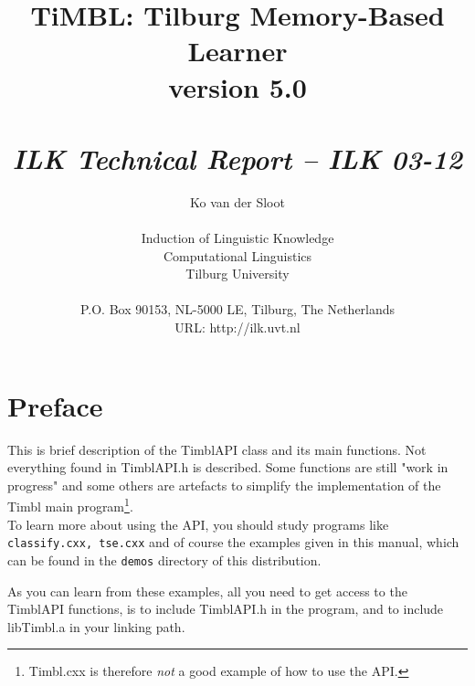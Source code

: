 

\parindent 0pt
\parskip 9pt

\newcommand{\chisq}{{$ \chi^2 $}}

\author{Ko van der Sloot\\ \ \\ Induction of Linguistic Knowledge\\
        Computational Linguistics\\ Tilburg University \\ \ \\
        P.O. Box 90153, NL-5000 LE, Tilburg, The Netherlands \\ URL:
        http://ilk.uvt.nl}

\title{{\huge TiMBL: Tilburg Memory-Based Learner} \\ \vspace*{0.5cm}
{\bf version 5.0} \\ \vspace*{0.5cm}{\huge API Reference Guide}\\
\vspace*{1cm} {\it ILK Technical Report -- ILK 03-12}}




\maketitle

\clearpage
\section{Preface}

This is brief description of the TimblAPI class and its main functions.
Not everything found in TimblAPI.h is described. Some functions are
still "work in progress" and some others are artefacts to simplify the
implementation of the Timbl main program\footnote{Timbl.cxx is
therefore {\em not} a good example of how to use the API.}. \\
To learn more about using the API, you should study programs like 
{\tt classify.cxx, tse.cxx} and of course the examples given in this
manual, which can be found in the {\tt demos} directory of this
distribution. 

As you can learn from these examples, all you need to get access to the
TimblAPI functions, is to include TimblAPI.h in the program, and to
include libTimbl.a in your linking path. 

